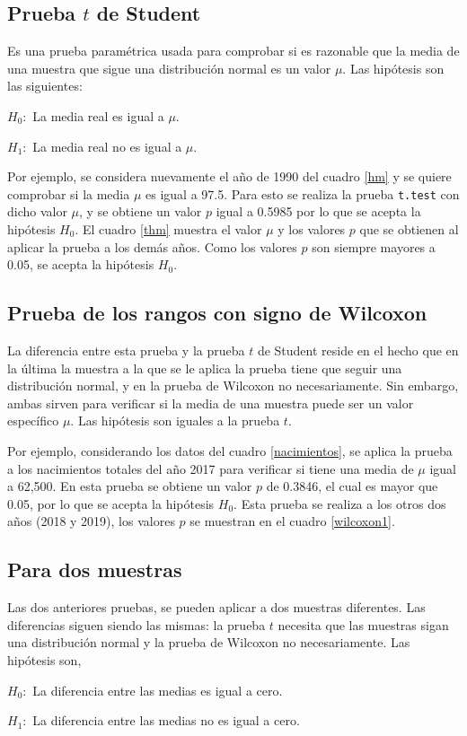 \documentclass[12pt,letterpaper]{article}
\begin{document}
\subsection{Prueba $t$ de Student}
Es una prueba paramétrica usada para comprobar si es razonable que la media de una muestra que sigue una distribución normal es un valor $\mu$. Las hipótesis son las siguientes:
\begin{center}
$H_0:$ La media real es igual a $\mu$.

$H_1:$ La media real no es igual a $\mu$.
\end{center}
Por ejemplo, se considera nuevamente el año de 1990 del cuadro \ref{hm} y se quiere comprobar si la media $\mu$ es igual a 97.5. Para esto se realiza la prueba \texttt{t.test} con dicho valor $\mu$, y se obtiene un valor $p$ igual a 0.5985 por lo que se acepta la hipótesis $H_0$. El cuadro \ref{thm} muestra el valor $\mu$ y los valores $p$ que se obtienen al aplicar la prueba a los demás años. Como los valores $p$ son siempre mayores a 0.05, se acepta la hipótesis $H_0$.



\subsection{Prueba de los rangos con signo de Wilcoxon}
La diferencia entre esta prueba y la prueba $t$ de Student reside en el hecho que en la última la muestra a la que se le aplica la prueba tiene que seguir una distribución normal, y en la prueba de Wilcoxon no necesariamente. Sin embargo, ambas sirven para verificar si la media de una muestra puede ser un valor específico $\mu$. Las hipótesis son iguales a la prueba $t$.

Por ejemplo, considerando los datos del cuadro \ref{nacimientos}, se aplica la prueba a los nacimientos totales del año 2017 para verificar si tiene una media de $\mu$ igual a 62,500. En esta prueba se obtiene un valor $p$ de 0.3846, el cual es mayor que 0.05, por lo que se acepta la hipótesis $H_0$. Esta prueba se realiza a los otros dos años (2018 y 2019), los valores $p$ se muestran en el cuadro \ref{wilcoxon1}.

\subsection{Para dos muestras}
Las dos anteriores pruebas, se pueden aplicar a dos muestras diferentes. Las diferencias siguen siendo las mismas: la prueba $t$ necesita que las muestras sigan una distribución normal y la prueba de Wilcoxon no necesariamente. Las hipótesis son,
\begin{center}
$H_0:$ La diferencia entre las medias es igual a cero.

$H_1:$ La diferencia entre las medias no es igual a cero.
\end{center}
\end{document}
